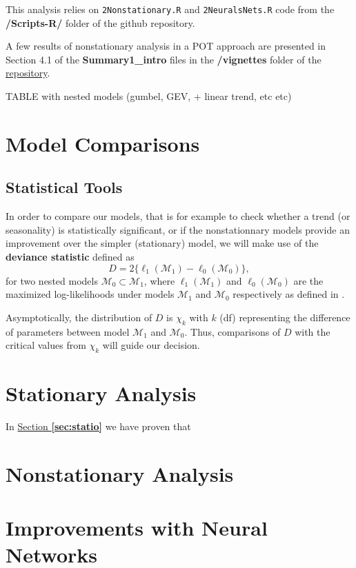 
This analysis relies on \texttt{2Nonstationary.R} and \texttt{2NeuralsNets.R} code from the \textbf{/Scripts-R/} folder of the github repository.

A few results of nonstationary analysis in a POT approach are presented in Section 4.1 of the \textbf{Summary1\_intro} files in the \textbf{/vignettes} folder of the \href{https://github.com/proto4426/PissoortThesis/tree/master/vignettes}{repository}.

TABLE with nested models (gumbel, GEV, + linear trend, etc etc)


\section{Model Comparisons}

\subsection{Statistical Tools}

In order to compare our models, that is for example to check whether a trend (or seasonality) is statistically significant, or if the nonstationnary models provide an improvement over the simpler (stationary) model, we will make use of the \textbf{deviance statistic} defined as 
\begin{equation}
D = 2\big\{\ell_1(\mathcal{M}_1)-\ell_0(\mathcal{M}_0)\big\},
\end{equation}
for two nested models $\mathcal{M}_0\subset \mathcal{M}_1$, where $\ell_1(\mathcal{M}_1)$ and $\ell_0(\mathcal{M}_0)$ are the maximized log-likelihoods under models $\mathcal{M}_1$ and $\mathcal{M}_0$ respectively as defined in .

Asymptotically, the distribution of $D$ is $\chi_k$ with $k$ (df) representing the difference of parameters between model $\mathcal{M}_1$ and $\mathcal{M}_0$. Thus, comparisons of $D$ with the critical values from $\chi_k$ will guide our decision.



\section{Stationary Analysis}


In \hyperref[sec:statio]{Section \textbf{\ref{sec:statio}}} we have proven that 

\section{Nonstationary Analysis}

\section{Improvements with Neural Networks}